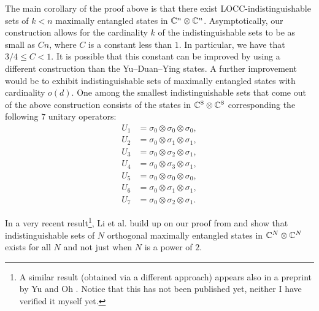 The main corollary of the proof above is that there exist 
LOCC-indistinguishable sets of $k < n$ maximally entangled states in 
$\mathbb{C}^{n}\otimes\mathbb{C}^{n}$.
Asymptotically, our construction allows for the cardinality $k$ of the indistinguishable 
sets to be as small as $Cn$, where $C$ is a constant less than $1$.
In particular, we have that $3/4 \leq C < 1$. 
It is possible that this constant can be improved by using 
a different construction than the Yu--Duan--Ying states.
A further improvement would be to exhibit 
indistinguishable sets of maximally entangled states with cardinality $o(d)$.
One among the smallest indistinguishable sets that come out of the above construction consists 
of the states in $\mathbb{C}^{8}\otimes\mathbb{C}^{8}$ corresponding the following $7$ unitary operators: 
\begin{equation}
  \label{eq:ydy_Us}
  \begin{aligned}
    U_{1} &= \sigma_{0}\otimes\sigma_{0}\otimes\sigma_{0},\\
    U_{2} &= \sigma_{0}\otimes\sigma_{1}\otimes\sigma_{1},\\
    U_{3} &= \sigma_{0}\otimes\sigma_{2}\otimes\sigma_{1},\\
    U_{4} &= \sigma_{0}\otimes\sigma_{3}\otimes\sigma_{1},\\
    U_{5} &= \sigma_{0}\otimes\sigma_{0}\otimes\sigma_{0},\\
    U_{6} &= \sigma_{0}\otimes\sigma_{1}\otimes\sigma_{1},\\
    U_{7} &= \sigma_{0}\otimes\sigma_{2}\otimes\sigma_{1}.
  \end{aligned}
\end{equation}

\begin{remark}
In a very recent result\footnote{A similar result (obtained via a different approach) appears also 
in a preprint by Yu and Oh \cite{Yu15}. Notice that this has not been
published yet, neither I have verified it myself yet.}, 
Li et al. \cite{Li15} build up on our proof from
\cite{Cosentino14} and show that indistinguishable sets of $N$ orthogonal
maximally entangled states in $\mathbb{C}^{N}\otimes\mathbb{C}^{N}$ exists for all 
$N$ and not just when $N$ is a power of $2$.
\end{remark}

